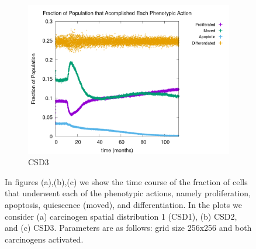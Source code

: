 \documentclass[\main/thesis.tex]{subfiles}
\begin{document}
\begin{figure}[H]
\begin{subfigure}[t]{.6\textwidth}
      \centering
      \includegraphics[width=\textwidth]{images/4_CarcinFunc/Fig4/numPheno_all_Func3.png}
      \caption{CSD3}
      \label{fig:CarcinFunc_numPheno_Func3}
    \end{subfigure}
    \caption{In figures (a),(b),(c) we show the time course of the fraction of cells that underwent each of the phenotypic actions, namely proliferation, apoptosis, quiescence (moved), and differentiation. In the plots we consider (a) carcinogen spatial distribution 1 (CSD1), (b) CSD2, and (c) CSD3. Parameters are as follows: grid size 256x256 and both carcinogens activated.}
    \label{fig:CarcinFunc_numPheno}
\end{figure}
\end{document}
